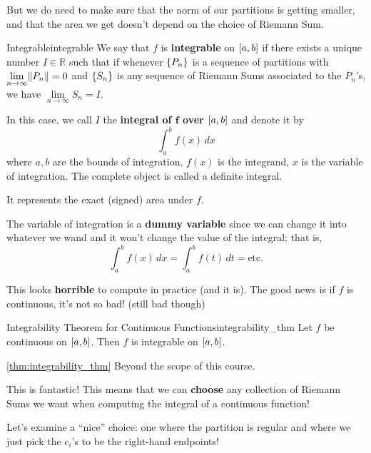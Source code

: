 But we do need to make sure that the norm of our partitions is getting smaller,
and that the area we get doesn't depend on the choice of Riemann Sum.

\begin{Definition}{Integrable}{integrable}
    We say that $ f $ is \textbf{integrable} on $ \interval{a}{b} $ if there exists a unique number
    $ I\in\mathbb{R} $ such that if whenever $ \{P_n\} $ is a sequence of partitions with
    $ \lim\limits_{{n} \to {\infty}}\lVert P_n\rVert=0 $ and $ \{S_n\} $ is any sequence of
    Riemann Sums associated to the $ P_n $'s, we have $ \lim\limits_{{n} \to {\infty}} S_n=I $.
\end{Definition}

In this case, we call $ I $ the \textbf{integral of $ \bm{f} $ over $ \interval{a}{b} $}
and denote it by
\[ \int_{a}^{b} f(x)\, dx \]
where $ a,b $ are the bounds of integration, $ f(x) $ is the integrand, $ x $ is the
variable of integration. The complete object is called a definite integral.

It represents the exact (signed) area under $ f $.

\begin{Remark}{}{}
    The variable of integration is a \textbf{dummy variable} since we can change it into
    whatever we wand and it won't change the value of the integral; that is,
    \[
        \int_{a}^{b} f(x)\,dx =
        \int_{a}^{b} f(t) \,d{t} = \text{etc.}
    \]
\end{Remark}

This looks \textbf{horrible} to compute in practice (and it is). The good news is if
$ f $ is continuous, it's not so bad! (still bad though)

\begin{Theorem}{Integrability Theorem for Continuous Functions}{integrability_thm}
    Let $ f $ be continuous on $ \interval{a}{b} $.
    Then $ f $ is integrable on $ \interval{a}{b} $.
\end{Theorem}

\begin{Proof}{\ref{thm:integrability_thm}}{}
    Beyond the scope of this course.
\end{Proof}

This is fantastic! This means that we can \textbf{choose} any collection of Riemann Sums
we want when computing the integral of a continuous function!

Let's examine a ``nice'' choice: one where the partition is regular and where we just
pick the $ c_i $'s to be the right-hand endpoints!

